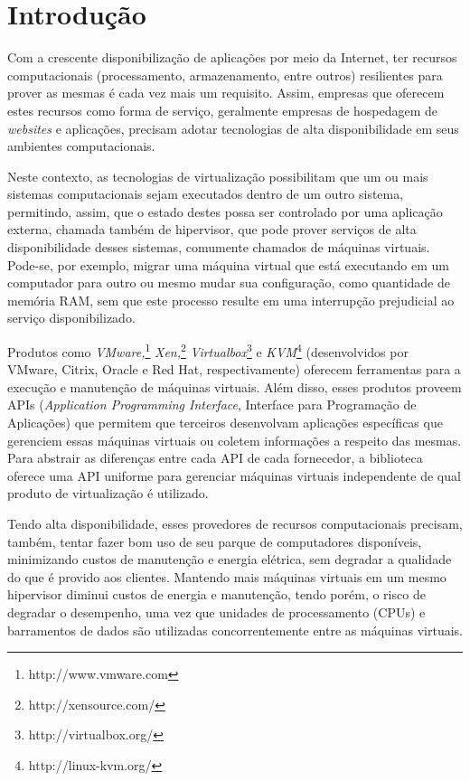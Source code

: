 %
%

\chapter{Introdução}

Com a crescente disponibilização de aplicações por meio da Internet, ter
recursos computacionais (processamento, armazenamento, entre outros)
resilientes para prover as mesmas é cada vez mais um requisito. Assim,
empresas que oferecem estes recursos como forma de serviço, geralmente
empresas de hospedagem de \emph{websites} e aplicações, precisam adotar
tecnologias de alta disponibilidade em seus ambientes computacionais.

Neste contexto, as tecnologias de virtualização possibilitam que um ou mais
sistemas computacionais sejam executados dentro de um outro sistema,
permitindo, assim, que o estado destes possa ser controlado por uma aplicação
externa, chamada também de hipervisor, que pode prover serviços de
alta disponibilidade desses sistemas, comumente chamados de máquinas
virtuais. Pode-se, por exemplo, migrar uma máquina virtual que está
executando em um computador para outro ou mesmo mudar sua configuração,
como quantidade de memória RAM, sem que este processo resulte em uma
interrupção prejudicial ao serviço disponibilizado.

Produtos como \emph{VMware,}\footnote{http://www.vmware.com}
\emph{Xen,}\footnote{http://xensource.com/}
\emph{Virtualbox}\footnote{http://virtualbox.org/} e
\emph{KVM}\footnote{http://linux-kvm.org/} (desenvolvidos por VMware,
Citrix, Oracle e Red Hat, respectivamente) oferecem ferramentas para a
execução e manutenção de máquinas virtuais. Além disso, esses produtos
proveem APIs (\emph{Application Programming Interface}, Interface para Programação
de Aplicações) que permitem que terceiros desenvolvam aplicações
específicas que gerenciem essas máquinas virtuais ou coletem informações a
respeito das mesmas. Para abstrair as diferenças entre cada API de cada
fornecedor, a biblioteca \libvirt{} oferece uma API uniforme para gerenciar
máquinas virtuais independente de qual produto de virtualização é
utilizado.

Tendo alta disponibilidade, esses provedores de recursos computacionais
precisam, também, tentar fazer bom uso de seu parque de computadores
disponíveis, minimizando custos de manutenção e energia elétrica,
sem degradar a qualidade do que é provido aos clientes. Mantendo mais
máquinas virtuais em um mesmo hipervisor diminui custos de energia e
manutenção, tendo porém, o risco de degradar o desempenho, uma vez que
unidades de processamento (CPUs) e barramentos de dados são utilizadas
concorrentemente entre as máquinas virtuais.

